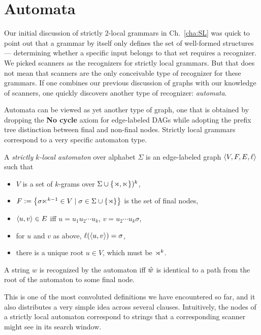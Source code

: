 \section{Automata}

Our initial discussion of strictly $2$-local grammars in Ch.~\ref{cha:SL} was quick to point out that a grammar by itself only defines the set of well-formed structures --- determining whether a specific input belongs to that set requires a recognizer.
We picked scanners as the recognizers for strictly local grammars.
But that does not mean that scanners are the only conceivable type of recognizer for these grammars.
If one combines our previous discussion of graphs with our knowledge of scanners, one quickly discovers another type of recognizer: \emph{automata}.

Automata can be viewed as yet another type of graph, one that is obtained by dropping the \textbf{No cycle} axiom for edge-labeled DAGs while adopting the prefix tree distinction between final and non-final nodes.
Strictly local grammars correspond to a very specific automaton type. 
%
\begin{definition}
    A \emph{strictly $k$-local automaton} over alphabet $\Sigma$ is an edge-labeled graph $\left \langle V, F, E, \ell \right \rangle $ such that
    \label{ex:SLImplement_Automaton}
    \begin{itemize}
        \item $V$ is a set of $k$-grams over $\Sigma \cup \left \{ \rtimes, \ltimes \right \})^k$,
        \item $F \mathrel{\mathop:}= \left \{  \sigma \ltimes^{k-1} \in V \mid \sigma \in \Sigma \cup \left \{ \rtimes \right \} \right \}$ is the set of final nodes,
        \item $\left \langle u,v \right \rangle  \in E$ iff $u = u_1 u_2 \cdots u_k$, $v = u_2 \cdots u_k \sigma$,
        \item for $u$ and $v$ as above, $\ell(\left \langle u,v \right \rangle ) = \sigma$,
        \item there is a unique root $u \in V$, which must be $\rtimes^{k}$.
    \end{itemize}
    A string $w$ is recognized by the automaton iff $\hat{w}$ is identical to a path from the root of the automaton to some final node.
\end{definition}
%
This is one of the most convoluted definitions we have encountered so far, and it also distributes a very simple idea across several clauses.
Intuitively, the nodes of a strictly local automaton correspond to strings that a corresponding scanner might see in its search window.
